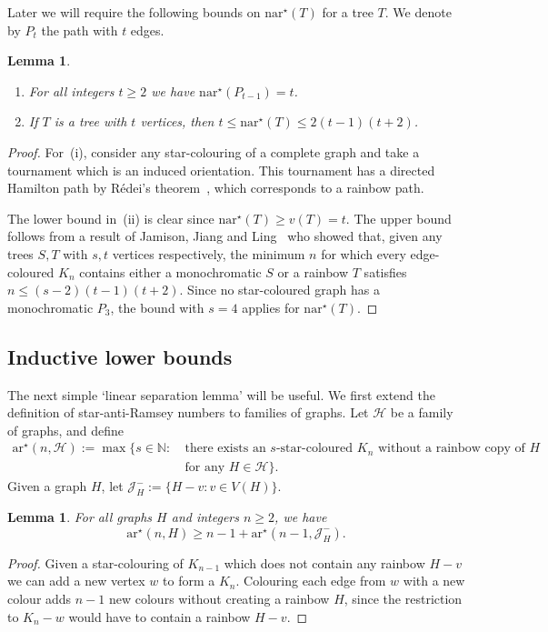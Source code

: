 \documentclass[a4paper, 12pt]{article}
\numberwithin{equation}{section}
\newtheorem{lemma}[theorem]{Lemma}
\def\sar{{\mathrm{ar}^{\star}}}
\def\nsar{{\mathrm{n}\sar}}
\newcommand{\mc}[1]{\mathcal{#1}}
\begin{document}
Later we will require the following bounds on $\nsar(T)$ for a tree $T$. We denote by $P_t$ the path with $t$ edges.

\begin{lemma}\label{lm:nsar}\hfill
\begin{enumerate}
\item For all integers $t \geq 2$ we have $\nsar(P_{t-1})=t$.
\item If $T$ is a tree with $t$ vertices, then $t \leq \nsar(T) \leq 2(t-1)(t+2)$.
\end{enumerate}
\end{lemma}

\begin{proof}
For~(i), consider any star-colouring of a complete graph and take a tournament which is an induced orientation. This tournament has a directed Hamilton path by R\'edei's theorem~\cite{Redei}, which corresponds to a rainbow path.

The lower bound in~(ii) is clear since $\nsar(T) \geq v(T) = t$. 
The upper bound follows from a result of Jamison, Jiang and Ling~\cite{JamisonJiangLing} who showed that, given any trees $S,T$ with $s,t$ vertices respectively, the minimum $n$ for which every edge-coloured $K_n$ contains either a monochromatic $S$ or a rainbow $T$ satisfies $n \leq (s-2)(t-1)(t+2)$.
Since no star-coloured graph has a monochromatic $P_3$, the bound with $s=4$ applies for $\nsar(T)$. 
\end{proof}

\subsection{Inductive lower bounds}\label{sec:linsep}

The next simple `linear separation lemma' will be useful.
We first extend the definition of star-anti-Ramsey numbers to families of graphs.
Let $\mc{H}$ be a family of graphs, and define
\begin{align*}
\sar(n,\mc{H}) := \max\{s \in \mathbb{N}: \ &\text{there exists an }s\text{-star-coloured }K_n\text{ without a rainbow copy of }H\\ &\text{for any }H \in \mc{H}\}.
\end{align*}
Given a graph $H$, let $\mc{J}^-_H := \{H-v: v \in V(H)\}$.



\begin{lemma}\label{lm:ls}
	For all graphs $H$ and integers $n \geq 2$, we have
    $$
    \sar(n,H)\geq n-1+\sar(n-1,\mc{J}^-_H).
    $$
\end{lemma}
\begin{proof}
	Given a star-colouring of $K_{n-1}$ which does not contain any rainbow $H-v$ we can add a new vertex $w$ to form a $K_n$. Colouring each edge from $w$ with a new colour adds $n-1$ new colours without creating a rainbow $H$, since the restriction to $K_n-w$ would have to contain a rainbow $H-v$.
\end{proof}
\end{document}

